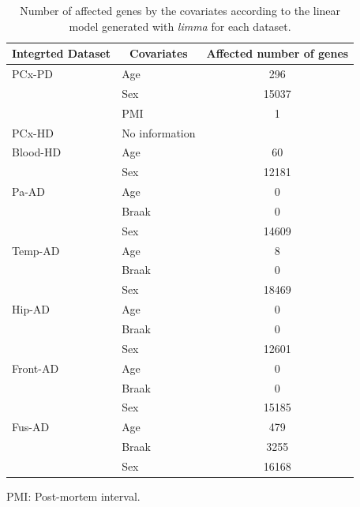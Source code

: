 \begin{table}[!ht]
\centering
\caption{Number of affected genes by the covariates according to the linear model generated with \textit{limma} for each dataset.}
\label{tab:limma-cov}
\begin{tabular}{llc}
\hline
\multicolumn{1}{c}{\textbf{Integrted Dataset}} & \multicolumn{1}{c}{\textbf{Covariates}} & \textbf{Affected number of genes} \\ \hline
PCx-PD   & Age   & 296   \\
         & Sex   & 15037 \\
         & PMI   & 1     \\
PCx-HD  & No information & \\
Blood-HD & Age   & 60    \\
         & Sex   & 12181 \\
Pa-AD    & Age   & 0     \\
         & Braak & 0     \\
         & Sex   & 14609 \\
Temp-AD  & Age   & 8     \\
         & Braak & 0     \\
         & Sex   & 18469 \\
Hip-AD   & Age   & 0     \\
         & Braak & 0     \\
         & Sex   & 12601 \\
Front-AD & Age   & 0     \\
         & Braak & 0     \\
         & Sex   & 15185 \\
Fus-AD   & Age   & 479   \\
         & Braak & 3255  \\
         & Sex   & 16168 \\ \hline
\end{tabular}

\footnotesize PMI: Post-mortem interval.
\end{table}

